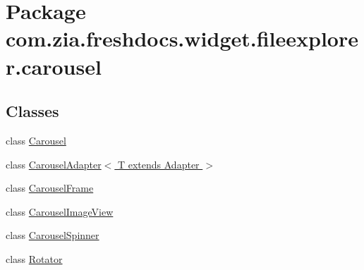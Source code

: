\hypertarget{namespacecom_1_1zia_1_1freshdocs_1_1widget_1_1fileexplorer_1_1carousel}{\section{Package com.\-zia.\-freshdocs.\-widget.\-fileexplorer.\-carousel}
\label{namespacecom_1_1zia_1_1freshdocs_1_1widget_1_1fileexplorer_1_1carousel}
}
\subsection*{Classes}
\begin{DoxyCompactItemize}
\item 
class \hyperlink{classcom_1_1zia_1_1freshdocs_1_1widget_1_1fileexplorer_1_1carousel_1_1_carousel}{Carousel}
\item 
class \hyperlink{classcom_1_1zia_1_1freshdocs_1_1widget_1_1fileexplorer_1_1carousel_1_1_carousel_adapter_3_01_t_01extends_01_adapter_01_4}{Carousel\-Adapter$<$ T extends Adapter $>$}
\item 
class \hyperlink{classcom_1_1zia_1_1freshdocs_1_1widget_1_1fileexplorer_1_1carousel_1_1_carousel_frame}{Carousel\-Frame}
\item 
class \hyperlink{classcom_1_1zia_1_1freshdocs_1_1widget_1_1fileexplorer_1_1carousel_1_1_carousel_image_view}{Carousel\-Image\-View}
\item 
class \hyperlink{classcom_1_1zia_1_1freshdocs_1_1widget_1_1fileexplorer_1_1carousel_1_1_carousel_spinner}{Carousel\-Spinner}
\item 
class \hyperlink{classcom_1_1zia_1_1freshdocs_1_1widget_1_1fileexplorer_1_1carousel_1_1_rotator}{Rotator}
\end{DoxyCompactItemize}
